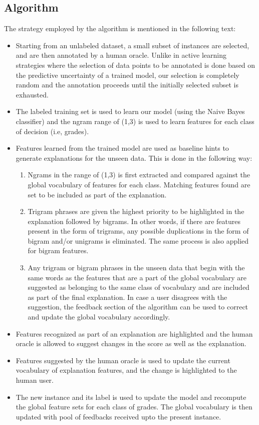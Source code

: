 \documentclass[letterpaper, 10 pt, conference]{ieeeconf}  %
\begin{document}
\subsection{Algorithm}

The strategy employed by the algorithm is mentioned in the following text:
\begin{itemize}
\item Starting from an unlabeled dataset, a small subset of instances are selected, and are then annotated by a human oracle. Unlike in active learning strategies where the selection of data points to be annotated is done based on the predictive uncertainty of a trained model, our selection is completely random and the annotation proceeds until the initially selected subset is exhausted.
\item The labeled training set is used to learn our model (using the Naive Bayes classifier) and the ngram range of (1,3) is used to learn features for each class of decision (i.e, grades).
\item Features learned from the trained model are used as baseline hints to generate explanations for the unseen data. This is done in the following way:
\begin{enumerate}
\item Ngrams in the range of (1,3) is first extracted and compared against the global vocabulary of features for each class. Matching features found are set to be included as part of the explanation.
\item Trigram phrases are given the highest priority to be highlighted in the explanation followed by bigrams. In other words, if there are features present in the form of trigrams, any possible duplications in the form of bigram and/or unigrams is eliminated. The same process is also applied for bigram features.
\item Any trigram or bigram phrases in the unseen data that begin with the same words as the features that are a part of the global vocabulary are suggested as belonging to the same class of vocabulary and are included as part of the final explanation. In case a user disagrees with the suggestion, the feedback section of the algorithm can be used to correct and update the global vocabulary accordingly.
\end{enumerate}
\item Features recognized as part of an explanation are highlighted and the human oracle is allowed to suggest changes in  the score as well as the explanation.
\item Features suggested by the human oracle is used to update the current vocabulary of explanation features, and the change is highlighted to the human user.
\item The new instance and its label is used to update the model and recompute the global feature sets for each class of grades. The global vocabulary is then updated with pool of feedbacks received upto the present instance.
\end{itemize}
\end{document}
